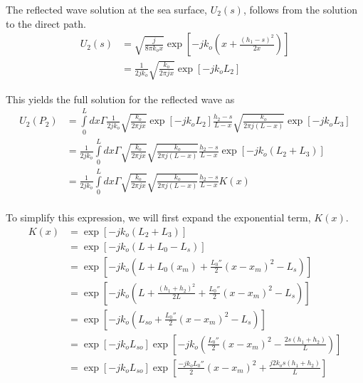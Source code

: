 The reflected wave solution at the sea surface, $U_2(s)$, follows from the solution to the direct path.
\begin{equation}
\begin{aligned}
U_2(s) &= \sqrt{\frac{j}{8\pi k_ox}}\exp\left[-jk_o\left(x + \frac{(h_1-s)^2}{2x}\right) \right]\\
&= \frac{1}{2jk_o}\sqrt{\frac{k_o}{2\pi jx}}\exp\left[-jk_oL_2\right]
\end{aligned}
\label{mp_eq:11ae}
\end{equation}
\renewcommand{\baselinestretch}{2} \small\normalsize

\noindent This yields the full solution for the reflected wave as 
\begin{equation}
\begin{aligned}
U_2(P_2) &= \int\limits_{0}^{L}dx\Gamma \frac{1}{2jk_o}\sqrt{\frac{k_o}{2\pi jx}}\exp\left[-jk_oL_2\right]\frac{h_2-s}{L-x}\sqrt{\frac{k_o}{2\pi j (L-x)}}\exp\left[-jk_oL_3 \right]  \\
&= \frac{1}{2jk_o}\int\limits_{0}^{L}dx\Gamma \sqrt{\frac{k_o}{2\pi jx}}\sqrt{\frac{k_o}{2\pi j (L-x)}}\frac{h_2-s}{L-x}\exp\left[-jk_o\left( L_2 + L_3\right) \right]  \\
&= \frac{1}{2jk_o}\int\limits_{0}^{L}dx\Gamma \sqrt{\frac{k_o}{2\pi jx}}\sqrt{\frac{k_o}{2\pi j (L-x)}}\frac{h_2-s}{L-x}K(x) \\
\label{mp_eq:12g}
\end{aligned}
\end{equation}
\renewcommand{\baselinestretch}{2} \small\normalsize

\noindent To simplify this expression, we will first expand the exponential term, $K(x)$.
\begin{equation}
\begin{aligned}
K(x)&= \exp\left[-jk_o\left( L_2 + L_3\right) \right] \\
&= \exp\left[-jk_o\left( L+L_0-L_s\right) \right]\\
&= \exp\left[-jk_o\left( L+L_0(x_m) + \frac{L_0''}{2}(x-x_m)^2-L_s\right) \right]\\
&= \exp\left[-jk_o\left( L+\frac{(h_1+h_2)^2}{2L} + \frac{L_0''}{2}(x-x_m)^2-L_s\right)\right]\\
&=\exp\left[-jk_o\left(L_{so}+\frac{L_0''}{2}(x-x_m)^2-L_s\right)\right]\\
&=\exp\left[-jk_oL_{so}\right]\exp\left[-jk_o\left(\frac{L_0''}{2}(x-x_m)^2-\frac{2s(h_1+h_2)}{L}\right)\right]\\
&=\exp\left[-jk_oL_{so}\right]\exp\left[\frac{-jk_oL_0''}{2}(x-x_m)^2+\frac{j2k_os(h_1+h_2)}{L}\right]\\
\label{mp_eq:12i}
\end{aligned}
\end{equation}
\renewcommand{\baselinestretch}{2} \small\normalsize

